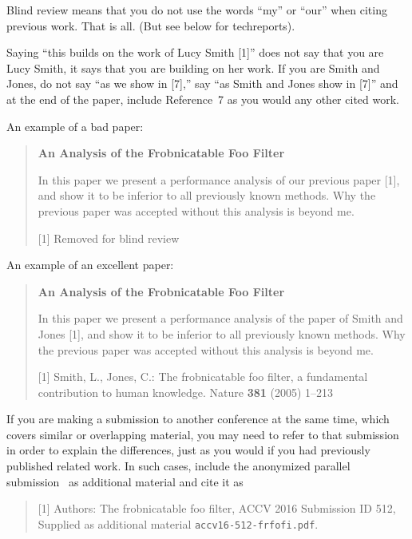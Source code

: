 \documentclass[runningheads]{llncs}
\begin{document}
Blind review means that you do not use the words ``my'' or ``our''
when citing previous work.  That is all.  (But see below for 
techreports).

Saying ``this builds on the work of Lucy Smith [1]'' does not say
that you are Lucy Smith, it says that you are building on her
work.  If you are Smith and Jones, do not say ``as we show in
[7],'' say ``as Smith and Jones show in [7]'' and at the end of the
paper, include Reference~7 as you would any other cited work.

An example of a bad paper:
\begin{quote}
\begin{center}
    {\bf An Analysis of the Frobnicatable Foo Filter}
\end{center}
   
   In this paper we present a performance analysis of our
   previous paper [1], and show it to be inferior to all
   previously known methods.  Why the previous paper was
   accepted without this analysis is beyond me.
   
   [1] Removed for blind review
\end{quote}
   
An example of an excellent paper:   
   
\begin{quote}
\begin{center}
     {\bf An Analysis of the Frobnicatable Foo Filter}
\end{center}
   
   In this paper we present a performance analysis of the
   paper of Smith and Jones [1], and show it to be inferior to
   all previously known methods.  Why the previous paper
   was accepted without this analysis is beyond me.
   
   [1] Smith, L., Jones, C.: The frobnicatable foo
   filter, a fundamental contribution to human knowledge.
   Nature {\bf 381} (2005) 1--213
\end{quote}
   
If you are making a submission to another conference at the same time,
which covers similar or overlapping material, you may need to refer to that
submission in order to explain the differences, just as you would if you
had previously published related work.  In such cases, include the
anonymized parallel submission~\cite{Authors16} as additional material and
cite it as
\begin{quote}
[1]  Authors: The frobnicatable foo filter, ACCV 2016 Submission ID 512,
Supplied as additional material {\tt accv16-512-frfofi.pdf}.
\end{quote}
\end{document}
